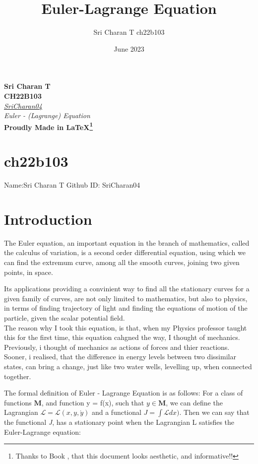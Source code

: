 \documentclass[a4paper]{article}
\author{Sri Charan T ch22b103}
\title{Euler-Lagrange Equation}
\date{June 2023}
\begin{document}
\begin{titlepage}
    \center\textbf{\Huge Sri Charan T}
    \\[0.5cm]
    \center\textbf{\huge CH22B103}
    \\[0.5cm]
    \center\textit{\href{https://github.com/SriCharan04/june2023}{\huge SriCharan04} }
    \\[0.75cm]
    \center\textit{\huge{Euler - (Lagrange) Equation}}
    \\[0.75cm]
    \center \textbf{\Huge{Proudly Made in \LaTeX}\footnote{Thanks to Book \cite{lam_latex}, that this document looks aesthetic, and informative!!}}
   
\end{titlepage}
\def\Lagrangian{n\sqrt{\left({dr\over d\theta}\right)^{2}+ {r}^{2}}}
\def\roots{\sqrt{{\dot r}^{2}+{r}^{2}}}

\section{ch22b103}
Name:Sri Charan T
Github ID: SriCharan04
\section {Introduction}
The Euler equation, an important equation in the branch of mathematics, called the calculus of variation, is a second order differential equation, using which we can find the extremum curve, among all the smooth curves, joining two given points, in space.

Its applications providing a convinient way to find all the stationary curves for a given family of curves, are not only limited to mathematics, but also to physics, in terms of finding trajectory of light and finding the equations of motion of the particle, given the scalar potential field.\\

The reason why I took this equation, is that, when my Physics professor taught this for the first time, this equation cahgned the way, I thought of mechanics. Previously, i thought of mechanics as actions of forces and thier reactions. Sooner, i realised, that the difference in energy levels between two dissimilar states, can bring a change, just like two water wells, levelling up, when connected together.


The formal definition of Euler - Lagrange Equation is as follows:
For a class of functions $\textbf{M}$, and function y = f(x), such that $y \in \textbf{M}$, we can define the Lagrangian $\mathcal{L}=\mathcal{L}(x,y,\acute{y})$ and a functional $\textit{J} = \int \mathcal{L} dx).$ Then we can say that the functional \textit{J}, has a stationary point when the Lagrangian L satisfies the Euler-Lagrange equation: 
\end{document}
